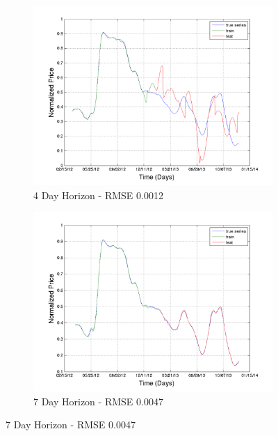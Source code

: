 \begin{figure}
        \centering
        \begin{subfigure}[b]{0.5\textwidth}
                \includegraphics[width=\textwidth]{img/model/wheat/pred_4}
                \caption{4 Day Horizon - RMSE 0.0012 }
                \label{fig:gull}
        \end{subfigure}%
        \begin{subfigure}[b]{0.5\textwidth}
                \includegraphics[width=\textwidth]{img/model/wheat/pred_7}
                \caption{7 Day Horizon - RMSE 0.0047}
                \label{fig:tiger}
        \end{subfigure}
       

\end{figure}
